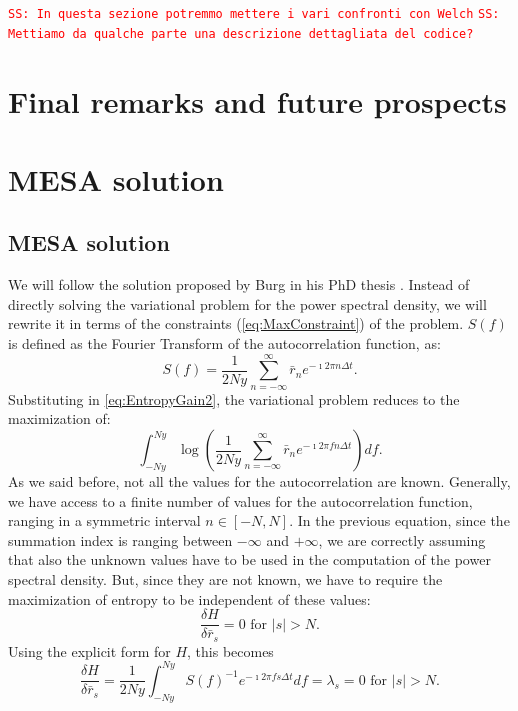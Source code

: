 \documentclass[twocolumn,showpacs,preprintnumbers,nofootinbib,prd,
superscriptaddress,10pt]{revtex4-1}
\newcommand{\sschmidt}[1]{{\textcolor{red}{\texttt{SS: #1}} }}
\begin{document}
\sschmidt{In questa sezione potremmo mettere i vari confronti con Welch}
\sschmidt{Mettiamo da qualche parte una descrizione dettagliata del codice?}

\section{Final remarks and future prospects}

\appendix
\section{MESA solution} \label{sec:MESA_solution}
\subsection{MESA solution}
We will follow the solution proposed by Burg in his PhD thesis \cite{burg1975maximum}. Instead of directly solving the variational problem for the power spectral density, we will rewrite it in terms of the constraints (\ref{eq:MaxConstraint}) of the problem. $S(f)$ is defined as the Fourier Transform of the autocorrelation function, as: 
\begin{equation}
    S(f) = \frac{1}{2 Ny}\sum_{n = -\infty}^{\infty} \bar r_n e^{- \imath 2 \pi n \Delta t}.
\end{equation}
Substituting in \ref{eq:EntropyGain2}, the variational problem reduces to the maximization of: 
\begin{equation}
    \int_{-Ny}^{Ny}  
    \log\left(\frac{1}{2 Ny}\sum_{n = -\infty}^{\infty} \bar r_n e^{-\imath 2 \pi f n \Delta t} 
    \right) df.
\end{equation}
As we said before, not all the values for the autocorrelation are known. Generally, we have access to a finite number of values for the autocorrelation function, ranging in a symmetric interval $n \in [-N, N]$. 
In the previous equation, since the summation index is ranging between $-\infty$ and $+\infty$, we are correctly assuming that also the unknown values have to be used in the computation of the power spectral density. But, since they are not known, we have to require the maximization of entropy to be independent of these values:
\begin{equation}\nonumber 
    \frac{\delta H}{\delta \bar r_s} = 0 \text{ for } \vert s \vert > N. 
\end{equation}
Using the explicit form for $H$, this becomes
\begin{equation}
      \frac{\delta H}{\delta \bar r_s} = \frac{1}{2Ny}\int_{-Ny}^{Ny} S(f)^{-1}e^{-\imath 2 \pi f s \Delta t } df = \lambda_s = 0 \text{ for } \vert s \vert > N. 
\end{equation}
\end{document}
